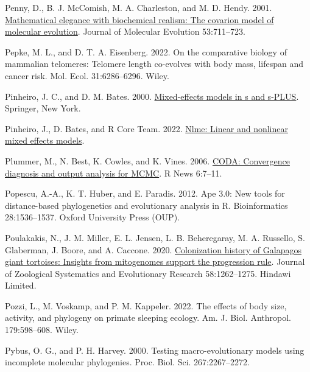 \documentclass[fleqn,10pt,lineno]{wlpeerj} %
\newlength{\cslhangindent}
\newlength{\cslentryspacingunit} %
\newenvironment{CSLReferences}[2] %
 {%
  \setlength{\parindent}{0pt}
  \ifodd #1
  \let\oldpar\par
  \def\par{\hangindent=\cslhangindent\oldpar}
  \fi
  \setlength{\parskip}{#2\cslentryspacingunit}
 }%
 {}
\begin{document}
\begin{CSLReferences}{1}{0}
\leavevmode{}%
Penny, D., B. J. McComish, M. A. Charleston, and M. D. Hendy. 2001. \href{https://doi.org/10.1007/s002390010258}{Mathematical elegance with biochemical realism: The covarion model of molecular evolution}. Journal of Molecular Evolution 53:711--723.

\leavevmode{}%
Pepke, M. L., and D. T. A. Eisenberg. 2022. On the comparative biology of mammalian telomeres: Telomere length co-evolves with body mass, lifespan and cancer risk. Mol. Ecol. 31:6286--6296. Wiley.

\leavevmode{}%
Pinheiro, J. C., and D. M. Bates. 2000. \href{https://doi.org/10.1007/b98882}{Mixed-effects models in s and s-PLUS}. Springer, New York.

\leavevmode{}%
Pinheiro, J., D. Bates, and R Core Team. 2022. \href{https://CRAN.R-project.org/package=nlme}{Nlme: Linear and nonlinear mixed effects models}.

\leavevmode{}%
Plummer, M., N. Best, K. Cowles, and K. Vines. 2006. \href{https://journal.r-project.org/archive/}{CODA: Convergence diagnosis and output analysis for MCMC}. R News 6:7--11.

\leavevmode{}%
Popescu, A.-A., K. T. Huber, and E. Paradis. 2012. Ape 3.0: New tools for distance-based phylogenetics and evolutionary analysis in {R}. Bioinformatics 28:1536--1537. Oxford University Press (OUP).

\leavevmode{}%
Poulakakis, N., J. M. Miller, E. L. Jensen, L. B. Beheregaray, M. A. Russello, S. Glaberman, J. Boore, and A. Caccone. 2020. \href{https://doi.org/10.1111/jzs.12387}{Colonization history of {G}alapagos giant tortoises: Insights from mitogenomes support the progression rule}. Journal of Zoological Systematics and Evolutionary Research 58:1262--1275. Hindawi Limited.

\leavevmode{}%
Pozzi, L., M. Voskamp, and P. M. Kappeler. 2022. The effects of body size, activity, and phylogeny on primate sleeping ecology. Am. J. Biol. Anthropol. 179:598--608. Wiley.

\leavevmode{}%
Pybus, O. G., and P. H. Harvey. 2000. Testing macro-evolutionary models using incomplete molecular phylogenies. Proc. Biol. Sci. 267:2267--2272.


\end{CSLReferences}
\end{document}
